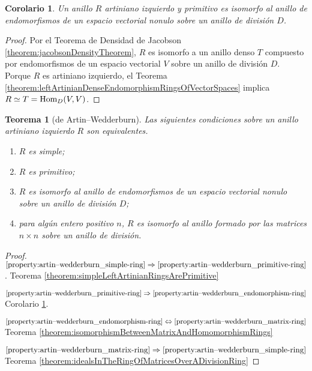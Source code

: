 \documentclass{report}
\newcommand{\Hom}{\textnormal{Hom}}
\newtheorem{theorem}{Teorema}
\newtheorem{corollary}{Corolario}
\begin{document}
  \begin{corollary}
    \label{corollary:leftArtinianPrimitiveRingsAreRingsOfEndomorphisms}
    Un anillo \(R\) artiniano izquierdo y primitivo es isomorfo al anillo de endomorfismos de un espacio vectorial nonulo sobre un anillo de división \(D\).
  \end{corollary}
  \begin{proof}
    Por el Teorema de Densidad de Jacobson \ref{theorem:jacobsonDensityTheorem}, \(R\) es isomorfo a un anillo denso \(T\) compuesto por endomorfismos de un espacio vectorial \(V\) sobre un anillo de división \(D\).
    Porque \(R\) es artiniano izquierdo, el Teorema \ref{theorem:leftArtinianDenseEndomorphismRingsOfVectorSpaces} implica \(R \simeq T = \Hom _D(V, V)\).
  \end{proof}

  \begin{theorem}[de Artin--Wedderburn]
    Las siguientes condiciones sobre un anillo artiniano izquierdo \(R\) son equivalentes.
    \begin{enumerate}
      \item
        \label{property:artin--wedderburn_simple-ring}
        \(R\) es simple;
      \item
        \label{property:artin--wedderburn_primitive-ring}
        \(R\) es primitivo;
      \item
        \label{property:artin--wedderburn_endomorphism-ring}
        \(R\) es isomorfo al anillo de endomorfismos de un espacio vectorial nonulo sobre un anillo de división \(D\);
      \item
        \label{property:artin--wedderburn_matrix-ring}
        para algún entero positivo \(n\), \(R\) es isomorfo al anillo formado por las matrices \(n \times n\) sobre un anillo de división.
    \end{enumerate}
  \end{theorem}
  \begin{proof}
    \(\ref{property:artin--wedderburn_simple-ring} \Rightarrow \ref{property:artin--wedderburn_primitive-ring}\).
    Teorema \ref{theorem:simpleLeftArtinianRingsArePrimitive}

    \(\ref{property:artin--wedderburn_primitive-ring} \Rightarrow \ref{property:artin--wedderburn_endomorphism-ring}\)
    Corolario \ref{corollary:leftArtinianPrimitiveRingsAreRingsOfEndomorphisms}.

    \(\ref{property:artin--wedderburn_endomorphism-ring} \Leftrightarrow \ref{property:artin--wedderburn_matrix-ring}\)
    Teorema \ref{theorem:isomorphismBetweenMatrixAndHomomorphismRings}

    \(\ref{property:artin--wedderburn_matrix-ring} \Rightarrow \ref{property:artin--wedderburn_simple-ring}\)
    Teorema \ref{theorem:idealsInTheRingOfMatricesOverADivisionRing}
  \end{proof}
\end{document}
